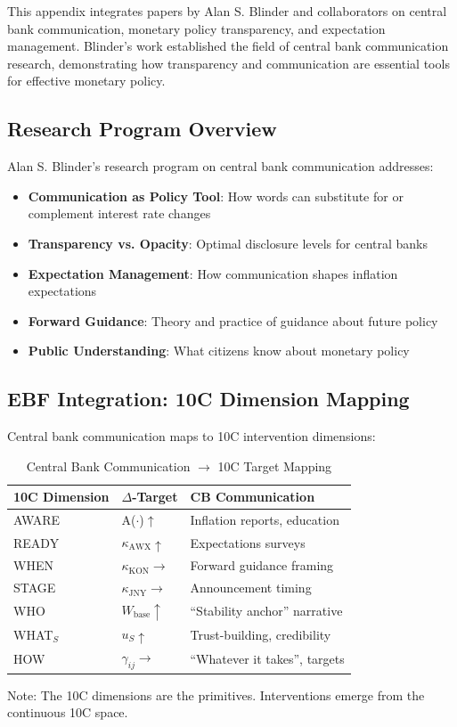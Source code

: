 This appendix integrates papers by Alan S. Blinder and collaborators on central bank
communication, monetary policy transparency, and expectation management. Blinder's work
established the field of central bank communication research, demonstrating how
transparency and communication are essential tools for effective monetary policy.

\subsection{Research Program Overview}

Alan S. Blinder's research program on central bank communication addresses:

\begin{itemize}
  \item \textbf{Communication as Policy Tool}: How words can substitute for or complement interest rate changes
  \item \textbf{Transparency vs. Opacity}: Optimal disclosure levels for central banks
  \item \textbf{Expectation Management}: How communication shapes inflation expectations
  \item \textbf{Forward Guidance}: Theory and practice of guidance about future policy
  \item \textbf{Public Understanding}: What citizens know about monetary policy
\end{itemize}

\subsection{EBF Integration: 10C Dimension Mapping}

Central bank communication maps to 10C intervention dimensions:

\begin{table}[htbp]
\centering
\caption{Central Bank Communication $\rightarrow$ 10C Target Mapping}
\label{tab:bl-10c}
\renewcommand{\arraystretch}{1.3}
\begin{tabular}{@{}lll@{}}
\toprule
\textbf{10C Dimension} & \textbf{$\Delta$-Target} & \textbf{CB Communication} \\
\midrule
AWARE & A($\cdot$)$\uparrow$ & Inflation reports, education \\
READY & $\kappa_{\text{AWX}}\uparrow$ & Expectations surveys \\
WHEN & $\kappa_{\text{KON}}\rightarrow$ & Forward guidance framing \\
STAGE & $\kappa_{\text{JNY}}\rightarrow$ & Announcement timing \\
WHO & $W_{\text{base}}\uparrow$ & ``Stability anchor'' narrative \\
WHAT$_S$ & $u_S\uparrow$ & Trust-building, credibility \\
HOW & $\gamma_{ij}\rightarrow$ & ``Whatever it takes'', targets \\
\bottomrule
\end{tabular}

\smallskip
\footnotesize{Note: The 10C dimensions are the primitives. Interventions emerge from the continuous 10C space.}
\end{table}

